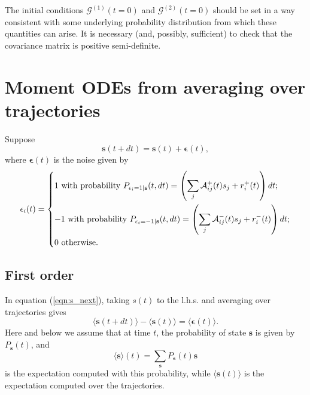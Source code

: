 \documentclass[a4paper, 11pt]{article}
\begin{document}
The initial conditions $\boldsymbol{\mathcal G}^{(1)}(t=0)$ and $\boldsymbol{\mathcal G}^{(2)}(t=0)$ should be set in a way consistent with some underlying probability distribution from which these quantities can arise. It is necessary (and, possibly, sufficient) to check that the covariance matrix is positive semi-definite.

\section{Moment ODEs from averaging over trajectories}
Suppose
\begin{equation}\label{eqn:s_next}
  \mathbf s(t+dt) = \mathbf s(t) + \boldsymbol\epsilon(t),
\end{equation}
where $\boldsymbol\epsilon(t)$ is the noise given by
\begin{equation*}
  \epsilon_i(t) = 
  \begin{dcases}
    1 \text{ with probability } P_{\epsilon_i=1 | \mathbf s}(t, dt) = \left(\sum_j\mathcal A^+_{ij}(t)s_j+r^+_i(t)\right)dt;\\
    -1 \text{ with probability } P_{\epsilon_i=-1 | \mathbf s}(t, dt) = \left(\sum_j\mathcal A^-_{ij}(t)s_j+r^-_i(t)\right)dt;\\
    0 \text{ otherwise}.
  \end{dcases}
\end{equation*}
\subsection{First order}
In equation (\ref{eqn:s_next}), taking $s(t)$ to the l.h.s. and averaging over trajectories gives
\begin{equation}\label{eqn:expectations_over_trajectories}
  \langle\mathbf s(t+dt)\rangle - \langle\mathbf s(t)\rangle = \langle\boldsymbol\epsilon(t)\rangle.
\end{equation}
Here and below we assume that at time $t$, the probability of state $\mathbf s$ is given by $P_{\mathbf s}(t)$, and
\begin{equation}
  \langle \mathbf s\rangle(t) = \sum_{\mathbf s}P_{\mathbf s}(t)\mathbf s
\end{equation}
is the expectation computed with this probability, while $\langle \mathbf s(t)\rangle$ is the expectation computed over the trajectories.
\end{document}
